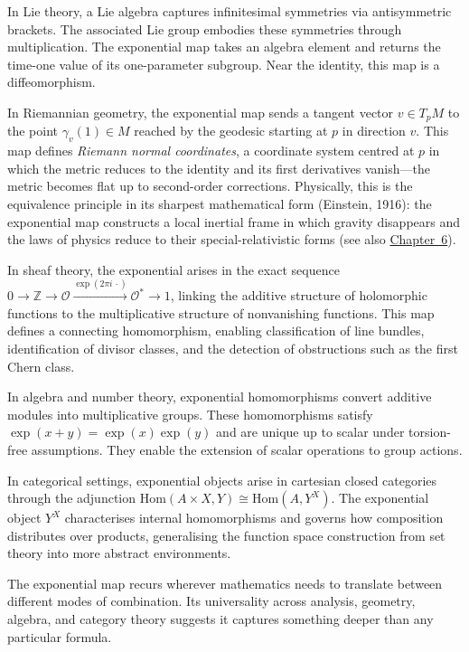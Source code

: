 In Lie theory, a Lie algebra captures infinitesimal symmetries via antisymmetric brackets. The associated Lie group embodies these symmetries through multiplication. The exponential map takes an algebra element and returns the time-one value of its one-parameter subgroup. Near the identity, this map is a diffeomorphism.

In Riemannian geometry, the exponential map sends a tangent vector \( v \in T_p M \) to the point \( \gamma_v(1) \in M \) reached by the geodesic starting at \( p \) in direction \( v \). This map defines \textit{Riemann normal coordinates}, a coordinate system centred at \( p \) in which the metric reduces to the identity and its first derivatives vanish—the metric becomes flat up to second-order corrections. Physically, this is the equivalence principle in its sharpest mathematical form (Einstein, 1916): the exponential map constructs a local inertial frame in which gravity disappears and the laws of physics reduce to their special-relativistic forms (see also \hyperref[ch:gravitytimedilation]{Chapter~6}).

In sheaf theory, the exponential arises in the exact sequence \( 0 \to \mathbb{Z} \to \mathcal{O} \xrightarrow{\exp(2\pi i\,\cdot)} \mathcal{O}^* \to 1 \), linking the additive structure of holomorphic functions to the multiplicative structure of nonvanishing functions. This map defines a connecting homomorphism, enabling classification of line bundles, identification of divisor classes, and the detection of obstructions such as the first Chern class.

In algebra and number theory, exponential homomorphisms convert additive modules into multiplicative groups. These homomorphisms satisfy \( \exp(x + y) = \exp(x)\exp(y) \) and are unique up to scalar under torsion-free assumptions. They enable the extension of scalar operations to group actions.

In categorical settings, exponential objects arise in cartesian closed categories through the adjunction \( \mathrm{Hom}(A \times X, Y) \cong \mathrm{Hom}(A, Y^X) \). The exponential object \( Y^X \) characterises internal homomorphisms and governs how composition distributes over products, generalising the function space construction from set theory into more abstract environments.

The exponential map recurs wherever mathematics needs to translate between different modes of combination. Its universality across analysis, geometry, algebra, and category theory suggests it captures something deeper than any particular formula.


